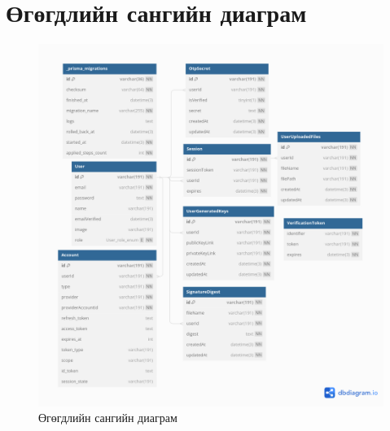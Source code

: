 \section[ӨС диаграм]{Өгөгдлийн сангийн диаграм}

\begin{figure}[h!]
	\centering
	\includegraphics[scale=0.5]{assets/cryptography.png}
	\caption{Өгөгдлийн сангийн диаграм}
	\label{fig:dbdiagram}
\end{figure}
\break
\newpage
